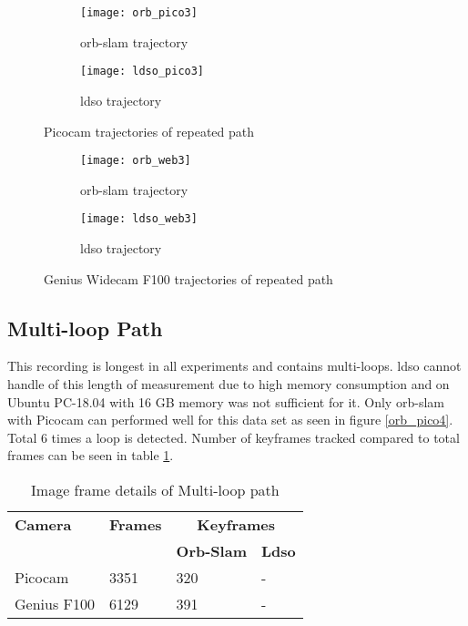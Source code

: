 \begin{figure}[H]
	\begin{subfigure}{.6\textwidth}
		\centering
		\texttt{[image: orb\_pico3]}
		\caption{\acrshort{orb}-\acrshort{slam} trajectory}
		\label{fig:orb_pico3}
	\end{subfigure}
	\begin{subfigure}{.5\textwidth}
		\centering
		\texttt{[image: ldso\_pico3]}
		\caption{\acrshort{ldso} trajectory}
		\label{fig:ldso_pico3}
	\end{subfigure}
	\caption{Picocam trajectories of repeated path}
	\label{fig:Pico3}
\end{figure}
\begin{figure}[H]
	\begin{subfigure}{.6\textwidth}
		\centering
		\texttt{[image: orb\_web3]}
		\caption{\acrshort{orb}-\acrshort{slam} trajectory}
		\label{fig:orb_web3}
	\end{subfigure}%
	\begin{subfigure}{.5\textwidth}
		\centering
		\texttt{[image: ldso\_web3]}
		\caption{\acrshort{ldso} trajectory}
		\label{fig:ldso_web3}
	\end{subfigure}
	\caption{Genius Widecam F100 trajectories of repeated path}
	\label{fig:Web3}
\end{figure}

\subsection{Multi-loop Path}
This recording is longest in all experiments and contains multi-loops. \acrshort{ldso} cannot handle of this length of measurement due to high memory consumption and on Ubuntu PC-18.04 with 16 GB memory was not sufficient for it. Only \acrshort{orb}-\acrshort{slam} with Picocam can performed well for this data set as seen in figure \ref{orb_pico4}. Total 6 times a loop is detected. Number of keyframes tracked compared to total frames can be seen in table \ref{table:multi-loop}. 
\begin{table}[H]
	\centering
	\renewcommand{\arraystretch}{1.5}
	\begin{tabular}{ l| l| l |l }
		\textbf{Camera} & \textbf{Frames} & \multicolumn{2}{c}{\textbf{Keyframes}}  \\    
		&      & \textbf{Orb-Slam}  & \textbf{Ldso}  \\
		\hline
		Picocam & 3351 & 320   & - \\ 
		\hline
		Genius F100 & 6129  &  391  & - \\ 
	\end{tabular}
	\caption{Image frame details of Multi-loop path}
	\label{table:multi-loop}
\end{table}

